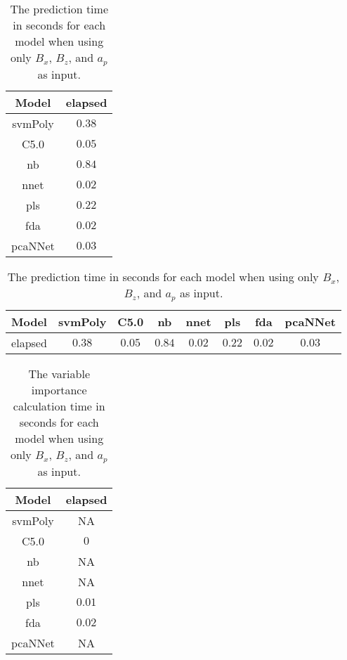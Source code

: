 \begin{table}[!ht]
	\centering
	\begin{tabular}{|c|c|}
		\hline
		Model & elapsed \\ \hline
		svmPoly & $0.38$ \\ \hline
		C5.0 & $0.05$ \\ \hline
		nb & $0.84$ \\ \hline
		nnet & $0.02$ \\ \hline
		pls & $0.22$ \\ \hline
		fda & $0.02$ \\ \hline
		pcaNNet & $0.03$ \\ \hline
	\end{tabular}
	\caption{The prediction time in seconds for each model when using only $B_{x}$, $B_{z}$, and $a_{p}$ as input.}
	\label{tab:time:xzap:predict}
\end{table}

\begin{table}[!ht]
	\centering
	\begin{tabular}{|c|c|c|c|c|c|c|c|}
		\hline
		Model & svmPoly & C5.0 & nb & nnet & pls & fda & pcaNNet \\ \hline
		elapsed & $0.38$ & $0.05$ & $0.84$ & $0.02$ & $0.22$ & $0.02$ & $0.03$ \\ \hline
	\end{tabular}
	\caption{The prediction time in seconds for each model when using only $B_{x}$, $B_{z}$, and $a_{p}$ as input.}
	\label{tab:time:reverse:xzap:predict}
\end{table}

\begin{table}[!ht]
	\centering
	\begin{tabular}{|c|c|}
		\hline
		Model & elapsed \\ \hline
		svmPoly & NA \\ \hline
		C5.0 & $0$ \\ \hline
		nb & NA \\ \hline
		nnet & NA \\ \hline
		pls & $0.01$ \\ \hline
		fda & $0.02$ \\ \hline
		pcaNNet & NA \\ \hline
	\end{tabular}
	\caption{The variable importance calculation time in seconds for each model when using only $B_{x}$, $B_{z}$, and $a_{p}$ as input.}
	\label{tab:time:xzap:importance}
\end{table}

